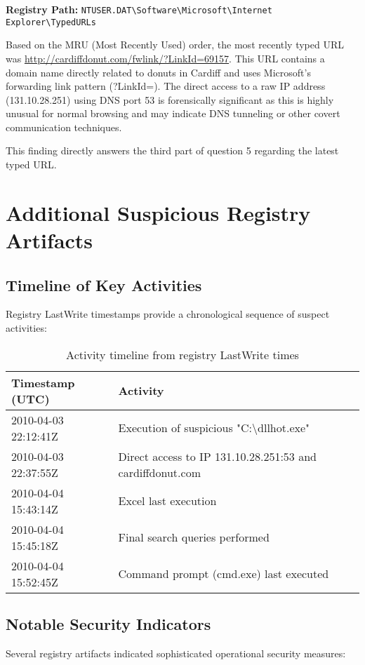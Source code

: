 \textbf{Registry Path:} \texttt{NTUSER.DAT\textbackslash Software\textbackslash Microsoft\textbackslash Internet Explorer\textbackslash TypedURLs}

Based on the MRU (Most Recently Used) order, the most recently typed URL was \url{http://cardiffdonut.com/fwlink/?LinkId=69157}. This URL contains a domain name directly related to donuts in Cardiff and uses Microsoft's forwarding link pattern (?LinkId=). The direct access to a raw IP address (131.10.28.251) using DNS port 53 is forensically significant as this is highly unusual for normal browsing and may indicate DNS tunneling or other covert communication techniques.

This finding directly answers the third part of question 5 regarding the latest typed URL.

\section{Additional Suspicious Registry Artifacts}

\subsection{Timeline of Key Activities}
Registry LastWrite timestamps provide a chronological sequence of suspect activities:

\begin{table}[htbp]
    \centering
    \begin{tabular}{|p{4cm}|p{9cm}|}
        \hline
        \textbf{Timestamp (UTC)} & \textbf{Activity} \\
        \hline
        2010-04-03 22:12:41Z & Execution of suspicious "C:\textbackslash dllhot.exe" \\
        \hline
        2010-04-03 22:37:55Z & Direct access to IP 131.10.28.251:53 and cardiffdonut.com \\
        \hline
        2010-04-04 15:43:14Z & Excel last execution \\
        \hline
        2010-04-04 15:45:18Z & Final search queries performed \\
        \hline
        2010-04-04 15:52:45Z & Command prompt (cmd.exe) last executed \\
        \hline
    \end{tabular}
    \caption{Activity timeline from registry LastWrite times}
    \label{tab:activity_timeline}
\end{table}

\subsection{Notable Security Indicators}
Several registry artifacts indicated sophisticated operational security measures:

